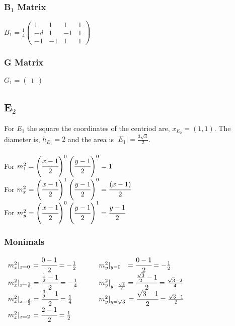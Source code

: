 \documentclass{article}
\begin{document}
\subsubsection{B$_1$ Matrix}
$B_1 = \frac{1}{4}\begin{pmatrix}
    1 & 1 & 1 & 1 \\
    -d & 1 & -1 & 1\\
    -1 & -1 & 1 & 1 
\end{pmatrix}$

\subsubsection{G Matrix}
$G_1 = \begin{pmatrix}
    1
\end{pmatrix}
$

\subsection{E$_2$}
For $E_1$ the square the coordinates of the centriod are, $x_{E_2} = (1,1).$ The diameter is, $ h_{E_1} = 2$ and the area is $|E_1| = \frac{3\sqrt{3}}{2}$.\\
\\
For $m_1^2 = \left(\cfrac{x - 1}{2}\right)^{0}\left(\cfrac{y - 1}{2}\right)^{0} = 1$\\
For $m_x^2 = \left(\cfrac{x - 1}{2}\right)^{1}\left(\cfrac{y - 1}{2}\right)^{0} = \cfrac{(x-1)}{2}$\\
For $m_y^2 = \left(\cfrac{x - 1}{2}\right)^{0}\left(\cfrac{y - 1}{2}\right)^{1} = \cfrac{y-1}{2}$\\

\subsubsection{Monimals}
$\begin{array}{ll}
m_x^2|_{x=0}\hspace{1.5pt} = \cfrac{0-1}{2} = -\frac{1}{2} &\qquad m_y^2|_{y=0} \hspace{7pt}= \cfrac{0-1}{2} = -\frac{1}{2} \\
m_x^2|_{x=\frac{1}{2}} = \cfrac{\frac{1}{2}-1}{2} = -\frac{1}{4} &\qquad m_y^2|_{y=\frac{\sqrt{3}}{2}} = \cfrac{\frac{\sqrt{3}}{2}-1}{2} = \frac{\sqrt{3}-2}{4} \\
m_x^2|_{x=\frac{3}{2}} = \cfrac{\frac{3}{2}-1}{2} = \frac{1}{4} &\qquad m_y^2|_{y=\sqrt{3}}\, = \cfrac{\sqrt{3}-1}{2} = \frac{\sqrt{3}-1}{2} \\
m_x^2|_{x=2}\hspace{1.5pt} = \cfrac{2-1}{2} = \frac{1}{2} &
\end{array}$
\end{document}
